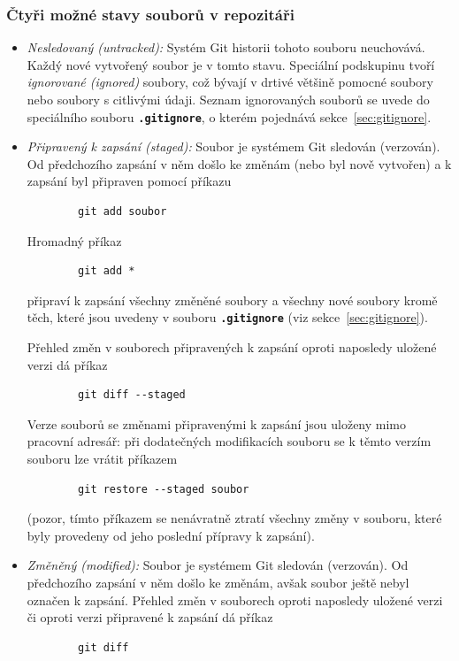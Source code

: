 \documentclass[a4paper,11pt,twoside]{article}
\def\file#1{\textnormal{\textbf{\texttt{#1}}}}
\theoremstyle{red}
\theoremstyle{green}
\begin{document}
\subsubsection{Čtyři možné stavy souborů v repozitáři}
    \begin{itemize}
        \item \emph{Nesledovaný (untracked):} 
            Systém Git historii tohoto souboru neuchovává.
            Každý nové vytvořený soubor je v tomto stavu.
            Speciální podskupinu tvoří \emph{ignorované (ignored)} soubory, což bývají v drtivé většině pomocné soubory nebo soubory s citlivými údaji.
            Seznam ignorovaných souborů se uvede do speciálního souboru \file{.gitignore}, o kterém pojednává sekce~\ref{sec:gitignore}.

        \item \emph{Připravený k zapsání (staged):} 
            Soubor je systémem Git sledován (verzován).
            Od předchozího zapsání v něm došlo ke změnám (nebo byl nově vytvořen) a k zapsání byl připraven pomocí příkazu
            \begin{lstlisting}
        git add soubor\end{lstlisting}
            Hromadný příkaz
            \begin{lstlisting}
        git add *\end{lstlisting}
            připraví k zapsání všechny změněné soubory a všechny nové soubory kromě těch, které jsou uvedeny v souboru \file{.gitignore} (viz sekce~\ref{sec:gitignore}).

            Přehled změn v souborech připravených k zapsání oproti naposledy uložené verzi dá příkaz
            \begin{lstlisting}
        git diff --staged\end{lstlisting}

            Verze souborů se změnami připravenými k zapsání jsou uloženy mimo pracovní adresář: při dodatečných modifikacích souboru se k těmto verzím souboru lze vrátit příkazem
            \begin{lstlisting}
        git restore --staged soubor\end{lstlisting}
            (pozor, tímto příkazem se nenávratně ztratí všechny změny v souboru, které byly provedeny od jeho poslední přípravy k zapsání).

        \item \emph{Změněný (modified):} 
            Soubor je systémem Git sledován (verzován).
            Od předchozího zapsání v něm došlo ke změnám, avšak soubor ještě nebyl označen k zapsání.
            Přehled změn v souborech oproti naposledy uložené verzi či oproti verzi připravené k zapsání dá příkaz
            \begin{lstlisting}
        git diff\end{lstlisting}
        

\end{itemize}
\end{document}
